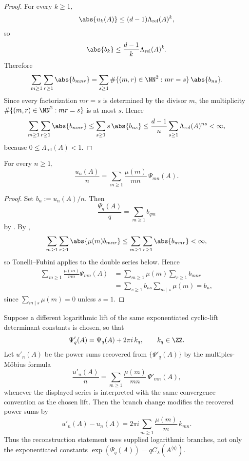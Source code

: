 \begin{proof}
  For every \(k\ge 1\),
  \[
    \abs{u_k(A)}
    \le (d-1)\Lambda_{\mathrm{rel}}(A)^k,
  \]
  so
  \[
    \abs{b_k}
    \le \frac{d-1}{k}\Lambda_{\mathrm{rel}}(A)^k.
  \]
  Therefore
  \[
    \sum_{m\ge 1}\sum_{r\ge 1}\abs{b_{mnr}}
    =
    \sum_{s\ge 1}
      \#\{(m,r)\in \NN^2:mr=s\}\,\abs{b_{ns}}.
  \]
  Since every factorization \(mr=s\) is determined by the divisor \(m\),
  the multiplicity \(\#\{(m,r)\in \NN^2:mr=s\}\) is at most \(s\). Hence
  \[
    \sum_{m\ge 1}\sum_{r\ge 1}\abs{b_{mnr}}
    \le
    \sum_{s\ge 1}s\,\abs{b_{ns}}
    \le
    \frac{d-1}{n}\sum_{s\ge 1}\Lambda_{\mathrm{rel}}(A)^{ns}
    <\infty,
  \]
  because \(0\le \Lambda_{\mathrm{rel}}(A)<1\).
\end{proof}

\begin{proposition}
  \label{prop:finite-part-cyclic-lift-mobius-inversion}
  For every \(n\ge 1\),
  \[
    \frac{u_n(A)}{n}
    =\sum_{m\ge 1}\frac{\mu(m)}{mn}\,\Psi_{mn}(A).
  \]
\end{proposition}

\begin{proof}
  Set \(b_n:=u_n(A)/n\). Then
  \[
    \frac{\Psi_q(A)}{q}
    =\sum_{m\ge 1}b_{qm}
  \]
  by . By
  ,
  \[
    \sum_{m\ge 1}\sum_{r\ge 1}\abs{\mu(m)b_{mnr}}
    \le
    \sum_{m\ge 1}\sum_{r\ge 1}\abs{b_{mnr}}
    <\infty,
  \]
  so Tonelli--Fubini applies to the double series below. Hence
  \begin{align*}
    \sum_{m\ge 1}\frac{\mu(m)}{mn}\Psi_{mn}(A)
    &=
    \sum_{m\ge 1}\mu(m)\sum_{r\ge 1}b_{mnr} \\
    &=
    \sum_{s\ge 1}b_{ns}\sum_{m\mid s}\mu(m)
    =b_n,
  \end{align*}
  since \(\sum_{m\mid s}\mu(m)=0\) unless \(s=1\).
\end{proof}

\begin{lemma}
  \label{lem:cyclic-lift-branch-ambiguity}
  Suppose a different logarithmic lift of the same exponentiated
  cyclic-lift determinant constants is chosen, so that
  \[
    \Psi'_q(A)=\Psi_q(A)+2\pi i\,k_q,
    \qquad k_q\in\ZZ.
  \]
  Let \(u'_n(A)\) be the power sums recovered from \(\{\Psi'_q(A)\}\) by
  the multiples-M\"obius formula
  \[
    \frac{u'_n(A)}{n}
    =
    \sum_{m\ge1}\frac{\mu(m)}{mn}\,\Psi'_{mn}(A),
  \]
  whenever the displayed series is interpreted with the same convergence
  convention as the chosen lift. Then the branch change modifies the
  recovered power sums by
  \[
    u'_n(A)-u_n(A)
    =
    2\pi i\sum_{m\ge1}\frac{\mu(m)}{m}\,k_{mn}.
  \]
  Thus the reconstruction statement uses supplied logarithmic branches,
  not only the exponentiated constants
  \(\exp(\Psi_q(A))=qC_\lambda(A^{\langle q\rangle})\).
\end{lemma}

